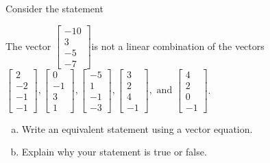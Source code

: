 
\begin{exerciseStatement}


Consider the statement 
\begin{center}\begin{minipage}{0.8\textwidth}
 The vector \( \left[\begin{array}{c}
-10 \\
3 \\
-5 \\
-7
\end{array}\right] \)is not a linear combination of the vectors \( \left[\begin{array}{c}
2 \\
-2 \\
-1 \\
-1
\end{array}\right] , \left[\begin{array}{c}
0 \\
-1 \\
3 \\
1
\end{array}\right] , \left[\begin{array}{c}
-5 \\
1 \\
-1 \\
-3
\end{array}\right] , \left[\begin{array}{c}
3 \\
2 \\
4 \\
-1
\end{array}\right] , \text{ and } \left[\begin{array}{c}
4 \\
2 \\
0 \\
-1
\end{array}\right] \). 
\end{minipage}\end{center}
    


\begin{enumerate}[(a)]
\item  Write an equivalent statement using a vector equation.
\item  Explain why your statement is true or false.
\end{enumerate}
    
\end{exerciseStatement}
    
